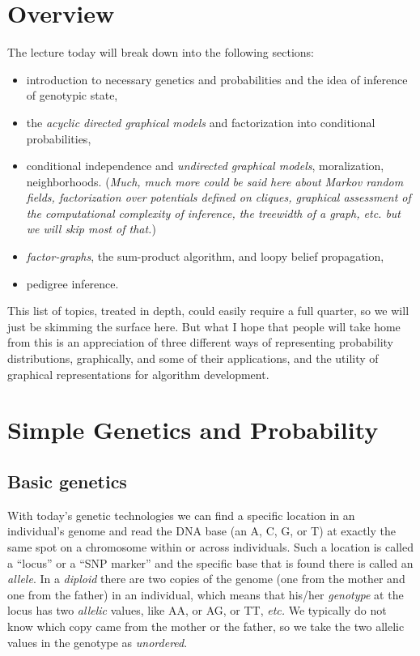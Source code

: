 \documentclass[11pt]{article}
\makeatletter
\newcommand{\etc}{{\em etc.}\@\xspace}
\makeatother
\begin{document}
\section{Overview}

The lecture today will break down into the following sections:
\begin{itemize}
\item introduction to necessary genetics and probabilities and the idea of inference of genotypic state,
\item the {\em acyclic directed graphical models} and factorization into conditional probabilities,
\item conditional independence and {\em undirected graphical models}, moralization, 
neighborhoods.  ({\sl Much, much more could be said here about Markov random fields, 
factorization over potentials defined on cliques,
graphical assessment of the computational complexity of inference, the treewidth of a graph,
etc. but we will skip most of that.})
\item  {\em factor-graphs}, the sum-product algorithm, and loopy belief propagation,
\item pedigree inference.
\end{itemize}
This list of topics, treated in depth, could easily require a full quarter, so we will just be
skimming the
surface here. But what I hope that people will take home from this is an appreciation 
of three different ways of representing probability distributions, graphically, and some of their
applications, and the utility of graphical representations for algorithm development.


\section{Simple Genetics and Probability}
\subsection{Basic genetics}
With today's genetic technologies we can find a specific location in an individual's genome and read the DNA base 
(an A, C, G, or T) at exactly the same spot on a chromosome within or across individuals.
Such a location is called a ``locus'' or a ``SNP marker'' and the specific base that is found there
is called an {\em allele}. In a {\em diploid} there are two copies of the genome 
(one from the mother and one from the father) in an individual, which means that his/her {\em genotype}
at the locus has two {\em allelic} values, like AA, or AG, or TT, \etc  
We typically do not know which copy came from the
mother or the father, so we take the two allelic values in the genotype as {\em unordered}.  
\end{document}
